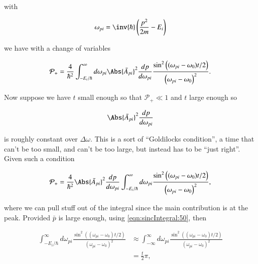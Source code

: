 with 

\begin{equation}\label{eqn:qmTwoL10:370}
\omega_{pi} = \inv{\hbar}\left( \frac{p^2}{2m} - E_i
\right)
\end{equation}

we have with a change of variables

\begin{equation}\label{eqn:qmTwoL10:390}
\mathcal{P}_{+} 
=
\frac{4}{\hbar^2}
\int_{-E_i/\hbar}^\infty d\omega_{pi}
\Abs{
\bar{A}_{pi}
}^2 
\frac{dp}{d\omega_{pi}}
\frac{
\sin^2\left( (\omega_{pi} - \omega_0) t/2 \right)
}{
\left( \omega_{pi} - \omega_0 \right)^2
}.
\end{equation}

Now suppose we have $t$ small enough so that $\mathcal{P}_{+} \ll 1$ and $t$ large enough so 

\begin{equation}\label{eqn:qmTwoL10:410}
\Abs{
\bar{A}_{pi}
}^2 
\frac{dp}{d\omega_{pi}}
\end{equation}

is roughly constant over $\Delta \omega$.  This is a sort of ``Goldilocks condition'', a time that can't be too small, and can't be too large, but instead has to be ``just right''.  Given such a condition

\begin{equation}\label{eqn:qmTwoL10:430}
\mathcal{P}_{+} 
=
\frac{4}{\hbar^2}
\Abs{
\bar{A}_{pi}
}^2 
\frac{dp}{d\omega_{pi}}
\int_{-E_i/\hbar}^\infty d\omega_{pi}
\frac{
\sin^2\left( (\omega_{pi} - \omega_0) t/2 \right)
}{
\left( \omega_{pi} - \omega_0 \right)^2
},
\end{equation}

where we can pull stuff out of the integral since the main contribution is at the peak.  Provided $\bar{p}$ is large enough, using \ref{eqn:sincIntegral:50}, then 

\begin{equation}\label{eqn:qmTwoL10:450}
\begin{aligned}
\int_{-E_i/\hbar}^\infty d\omega_{pi}
\frac{
\sin^2\left( (\omega_{pi} - \omega_0) t/2 \right)
}{
\left( \omega_{pi} - \omega_0 \right)^2
}
&\approx 
\int_{-\infty}^\infty d\omega_{pi}
\frac{
\sin^2\left( (\omega_{pi} - \omega_0) t/2 \right)
}{
\left( \omega_{pi} - \omega_0 \right)^2
} \\
&=
\frac{t}{2} \pi,
\end{aligned}
\end{equation}

